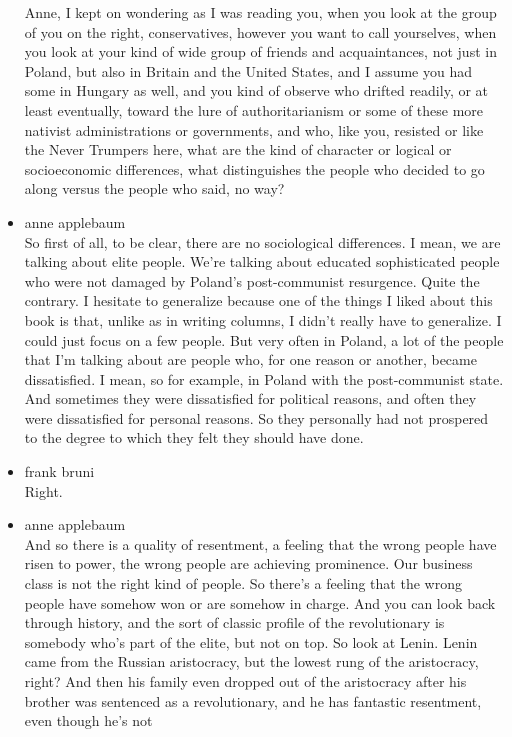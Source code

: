 \begin{itemize}
  Anne, I kept on wondering as I was reading you, when you look at the
  group of you on the right, conservatives, however you want to call
  yourselves, when you look at your kind of wide group of friends and
  acquaintances, not just in Poland, but also in Britain and the United
  States, and I assume you had some in Hungary as well, and you kind of
  observe who drifted readily, or at least eventually, toward the lure
  of authoritarianism or some of these more nativist administrations or
  governments, and who, like you, resisted or like the Never Trumpers
  here, what are the kind of character or logical or socioeconomic
  differences, what distinguishes the people who decided to go along
  versus the people who said, no way?
\item
  anne applebaum\\
  So first of all, to be clear, there are no sociological differences. I
  mean, we are talking about elite people. We're talking about educated
  sophisticated people who were not damaged by Poland's post-communist
  resurgence. Quite the contrary. I hesitate to generalize because one
  of the things I liked about this book is that, unlike as in writing
  columns, I didn't really have to generalize. I could just focus on a
  few people. But very often in Poland, a lot of the people that I'm
  talking about are people who, for one reason or another, became
  dissatisfied. I mean, so for example, in Poland with the
  post-communist state. And sometimes they were dissatisfied for
  political reasons, and often they were dissatisfied for personal
  reasons. So they personally had not prospered to the degree to which
  they felt they should have done.
\item
  frank bruni\\
  Right.
\item
  anne applebaum\\
  And so there is a quality of resentment, a feeling that the wrong
  people have risen to power, the wrong people are achieving prominence.
  Our business class is not the right kind of people. So there's a
  feeling that the wrong people have somehow won or are somehow in
  charge. And you can look back through history, and the sort of classic
  profile of the revolutionary is somebody who's part of the elite, but
  not on top. So look at Lenin. Lenin came from the Russian aristocracy,
  but the lowest rung of the aristocracy, right? And then his family
  even dropped out of the aristocracy after his brother was sentenced as
  a revolutionary, and he has fantastic resentment, even though he's not

\end{itemize}

